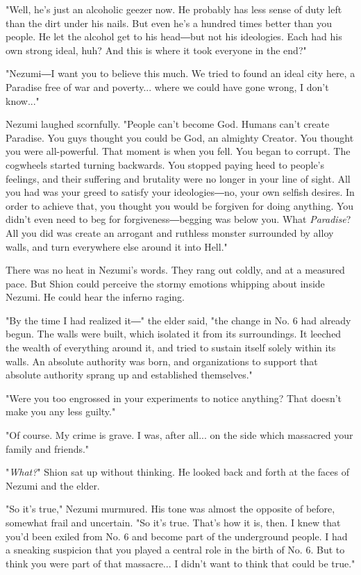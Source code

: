 "Well, he's just an alcoholic geezer now. He probably has less sense of
duty left than the dirt under his nails. But even he's a hundred times
better than you people. He let the alcohol get to his head―but not his
ideologies. Each had his own strong ideal, huh? And this is where it
took everyone in the end?"

"Nezumi―I want you to believe this much. We tried to found an ideal city
here, a Paradise free of war and poverty... where we could have gone
wrong, I don't know..."

Nezumi laughed scornfully. "People can't become God. Humans can't create
Paradise. You guys thought you could be God, an almighty Creator. You
thought you were all-powerful. That moment is when you fell. You began
to corrupt. The cogwheels started turning backwards. You stopped paying
heed to people's feelings, and their suffering and brutality were no
longer in your line of sight. All you had was your greed to satisfy your
ideologies―no, your own selfish desires. In order to achieve that, you
thought you would be forgiven for doing anything. You didn't even need
to beg for forgiveness―begging was below you. What \emph{Paradise}? All you did
was create an arrogant and ruthless monster surrounded by alloy walls,
and turn everywhere else around it into Hell."

There was no heat in Nezumi's words. They rang out coldly, and at a
measured pace. But Shion could perceive the stormy emotions whipping
about inside Nezumi. He could hear the inferno raging.

"By the time I had realized it―" the elder said, "the change in No. 6
had already begun. The walls were built, which isolated it from its
surroundings. It leeched the wealth of everything around it, and tried
to sustain itself solely within its walls. An absolute authority was
born, and organizations to support that absolute authority sprang up and
established themselves."

"Were you too engrossed in your experiments to notice anything? That
doesn't make you any less guilty."

"Of course. My crime is grave. I was, after all... on the side which
massacred your family and friends."

"\emph{What?}" Shion sat up without thinking. He looked back and forth at the
faces of Nezumi and the elder.

"So it's true," Nezumi murmured. His tone was almost the opposite of
before, somewhat frail and uncertain. "So it's true. That's how it is,
then. I knew that you'd been exiled from No. 6 and become part of the
underground people. I had a sneaking suspicion that you played a central
role in the birth of No. 6. But to think you were part of that
massacre... I didn't want to think that could be true."

